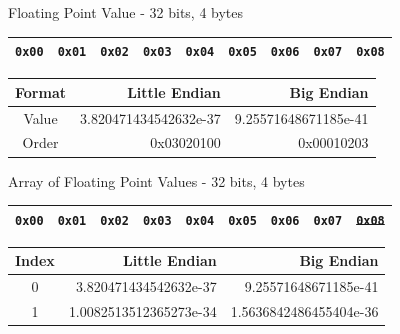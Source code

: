 \documentclass{beamer}
\begin{document}
\begin{frame}{Floating Point Value - 32 bits, 4 bytes}

\begin{table}[]
\begin{tabular}{|l|l|l|l|l|l|l|l|l|}
\hline
 \color{red}\texttt{0x00} & \color{red}\texttt{0x01} & \color{red}\texttt{0x02} & \color{red}\texttt{0x03} & \texttt{0x04} & \texttt{0x05} & \texttt{0x06} & \texttt{0x07} &
 \texttt{0x08} \\
\hline 
\end{tabular}
\end{table}

\begin{table}[]
\begin{tabular}{c r r}
Format & Little Endian & Big Endian \\
\hline
Value &  3.820471434542632e-37   & 9.25571648671185e-41 \\
Order & 0x03020100 & 0x00010203
\end{tabular}
\end{table}

\end{frame}

\begin{frame}{Array of Floating Point Values - 32 bits, 4 bytes}

\begin{table}[]
\begin{tabular}{|l|l|l|l|l|l|l|l|l|}
\hline
 \color{red}\texttt{0x00} & \color{red}\texttt{0x01} & \color{red}\texttt{0x02} & \color{red}\texttt{0x03} & \color{blue}\texttt{0x04} & \color{blue}\texttt{0x05} & \color{blue}\texttt{0x06} & \color{blue}\texttt{0x07} &
 \sout{\texttt{0x08}} \\
\hline 
\end{tabular}
\end{table}

\begin{table}[]
\begin{tabular}{c r r}
Index & Little Endian & Big Endian \\
\hline
0 &  3.820471434542632e-37   & 9.25571648671185e-41 \\
1 & 1.0082513512365273e-34 & 1.5636842486455404e-36
\end{tabular}
\end{table}

\end{frame}
\end{document}
